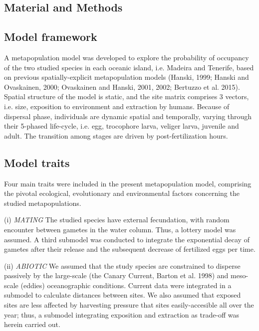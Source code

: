 \documentclass[12pt]{article}
\begin{document}
\begin{flushleft}
\section{Material and Methods}
\subsection{Model framework}
A metapopulation model was developed to explore the probability of occupancy of the two studied species in each oceanic island, i.e. Madeira and Tenerife, based on previous spatially-explicit metapopulation models (Hanski, 1999; Hanski and Ovaskainen, 2000; Ovaskainen and Hanski, 2001, 2002; Bertuzzo et al. 2015). Spatial structure of the model is static, and the site matrix comprises 3 vectors, i.e. size, exposition to environment and extraction by humans. Because of dispersal phase, individuals are dynamic spatial and temporally, varying through their 5-phased life-cycle, i.e. egg, trocophore larva, veliger larva, juvenile and adult. The transition among stages are driven by post-fertilization hours.
\subsection {Model traits}
Four main traits were included in the present metapopulation model, comprising the pivotal ecological, evolutionary and environmental factors concerning the studied metapopulations.

(i) \textit{MATING}
The studied species have external fecundation, with random encounter between gametes in the water column. Thus, a lottery model was assumed. A third submodel was conducted to integrate the exponential decay of gametes after their release and the subsequent decrease of fertilized eggs per time.

(ii) \textit{ABIOTIC}
We assumed that the study species are constrained to disperse passively by the large-scale (the Canary Current, Barton et al. 1998) and meso-scale (eddies) oceanographic conditions. Current data were integrated in a submodel to calculate distances between sites. We also assumed that exposed sites are less affected by harvesting pressure that sites easily-accesible all over the year; thus, a submodel integrating exposition and extraction as trade-off was herein carried out.


\end{flushleft}
\end{document}
